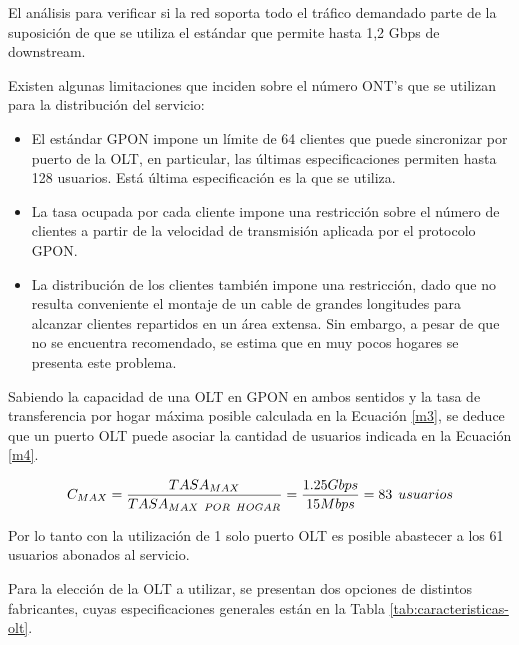 \begin{enumerate}
\begin{enumerate}
El análisis para verificar si la red soporta todo el tráfico demandado parte de la suposición de que se utiliza el estándar que permite hasta 1,2 Gbps de downstream.


Existen algunas limitaciones que inciden sobre el número ONT’s que se utilizan para la distribución del servicio:
\begin{itemize}
\item El estándar GPON impone un límite de 64 clientes que puede sincronizar por puerto de la OLT, en particular, las últimas especificaciones permiten hasta 128 usuarios. Está última especificación es la que se utiliza.
\item La tasa ocupada por cada cliente impone una restricción sobre el número de clientes a partir de la velocidad de transmisión aplicada por el protocolo GPON.
\item La distribución de los clientes también impone una restricción, dado que no resulta conveniente el montaje de un cable de grandes longitudes para alcanzar clientes repartidos en un área extensa. Sin embargo, a pesar de que no se encuentra recomendado, se estima que en muy pocos hogares se presenta este problema.
\end{itemize}











Sabiendo la capacidad de una OLT en GPON en ambos sentidos y la tasa de transferencia por hogar máxima posible calculada en la Ecuación \ref{m3}, se deduce que un puerto OLT puede asociar la cantidad de usuarios indicada en la Ecuación \ref{m4}.

\begin{equation}
C_{MAX}=\frac{TASA_{MAX}}{TASA_{MAX\hspace{0.15cm}POR\hspace{0.15cm}HOGAR}}=\frac{1.25Gbps}{15Mbps}=83\hspace{0.15cm}usuarios
\label{m4}
\end{equation}

Por lo tanto con la utilización de 1 solo puerto OLT es posible abastecer a los 61 usuarios abonados al servicio.


Para la elección de la OLT a utilizar, se presentan dos opciones de distintos fabricantes, cuyas especificaciones generales están en la Tabla \ref{tab:caracteristicas-olt}.



\end{enumerate}
\end{enumerate}
